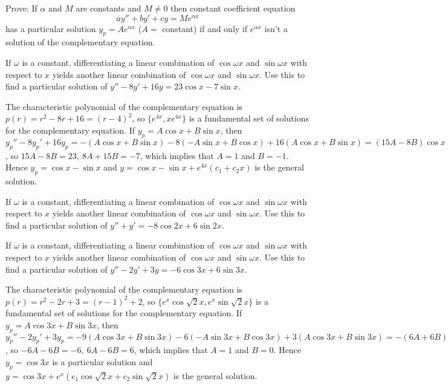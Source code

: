 \documentclass{ximera}
\begin{document}
\begin{problem}\label{exer:5.3.23}
Prove: If $\alpha$ and $M$ are constants and $M\ne0$  then
constant coefficient equation
$$
ay''+by'+cy=M e^{\alpha x}
$$
has a particular solution $y_p=Ae^{\alpha x}$ ($A=$ constant)
 if and only if $e^{\alpha x}$ isn't  a solution of the
complementary equation.
\end{problem}

\begin{problem}\label{exer:5.3.24} 
If $\omega$ is a constant,  differentiating a linear
combination of $\cos\omega x$ and $\sin\omega x$ with respect to $x$
yields another linear combination of $\cos\omega x$ and $\sin\omega
x$. Use this to find a
particular solution of $y''-8y'+16y=23\cos x-7\sin x$.
\begin{solution}
The characteristic polynomial of the complementary equation is
$p(r)=r^2-8r+16=(r-4)^2$, so
 $\{e^{4x},xe^{4x}\}$
is a fundamental set of solutions for the complementary equation.
If $y_p=A\cos x+B\sin x$, then
$y_p''-8y_p'+16y_p=-(A\cos x+B\sin x)-8(-A\sin x+B\cos x)+
16(A\cos x+B\sin x)=(15A-8B)\cos x+(8A+15B)\sin x$, so
$15A-8B=23,\ 8A+15B=-7$, which implies that $A=1$ and $B=-1$.
Hence $y_p=\cos x-\sin x$ and
 $y=\cos x-\sin x+e^{4x}(c_1+c_2x)$ is the general solution.
\end{solution}
\end{problem}

\begin{problem}\label{exer:5.3.25} If $\omega$ is a constant,  differentiating a linear
combination of $\cos\omega x$ and $\sin\omega x$ with respect to $x$
yields another linear combination of $\cos\omega x$ and $\sin\omega
x$. Use this to find a
particular solution of $y''+y'=-8\cos2x+6\sin2x$.
\end{problem}


 \begin{problem}\label{exer:5.3.26}  If $\omega$ is a constant,  differentiating a linear
combination of $\cos\omega x$ and $\sin\omega x$ with respect to $x$
yields another linear combination of $\cos\omega x$ and $\sin\omega
x$. Use this to find a
particular solution of $y''-2y'+3y=-6\cos3x+6\sin3x$.
\begin{solution}
The characteristic polynomial of the complementary equation is
$p(r)=r^2-2r+3=(r-1)^2+2$, so
$\{e^x\cos \sqrt{2}x,e^{x}\sin \sqrt{2} x\}$
is a fundamental set of solutions for the complementary equation.
If $y_p=A\cos3x+B\sin3x$, then
$y_p''-2y_p'+3y_p=-9(A\cos3x+B\sin3x)-6(-A\sin3x+B\cos3x)+
3(A\cos3x+B\sin3x)=-(6A+6B)\cos3x+(6A-6B)\sin3x$, so
$-6A-6B=-6,\ 6A-6B=6$, which implies that $A=1$ and $B=0$.
Hence $y_p=\cos3x$ is a particular solution and
$y=\cos3x+e^x(c_1\cos \sqrt{2}x+c_2\sin \sqrt{2} x)$
 is the general solution.
\end{solution}
\end{problem}
\end{document}
